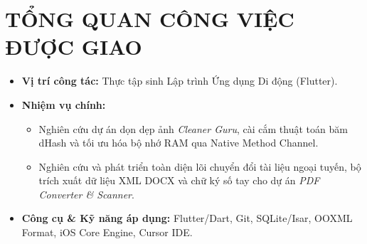 \documentclass[12pt, a4paper]{article}
\begin{document}
\section{TỔNG QUAN CÔNG VIỆC ĐƯỢC GIAO}
\begin{itemize}
    \item \textbf{Vị trí công tác:} Thực tập sinh Lập trình Ứng dụng Di động (Flutter).
    \item \textbf{Nhiệm vụ chính:} 
    \begin{itemize}
        \item Nghiên cứu dự án dọn dẹp ảnh \textit{Cleaner Guru}, cài cắm thuật toán băm dHash và tối ưu hóa bộ nhớ RAM qua Native Method Channel.
        \item Nghiên cứu và phát triển toàn diện lõi chuyển đổi tài liệu ngoại tuyến, bộ trích xuất dữ liệu XML DOCX và chữ ký số tay cho dự án \textit{PDF Converter \& Scanner}.
    \end{itemize}
    \item \textbf{Công cụ \& Kỹ năng áp dụng:} Flutter/Dart, Git, SQLite/Isar, OOXML Format, iOS Core Engine, Cursor IDE.
\end{itemize}

\newcommand{\cleanerUseCaseFigure}{%
\begin{figure}[H]
\centering
\begin{tikzpicture}[
    uc/.style={draw=blue!70!black, thick, fill=blue!6, ellipse, minimum width=4.6cm, minimum height=1.1cm, align=center, font=\small},
    actor_line/.style={ultra thick, draw=black!70},
    link_line/.style={thick, draw=black!70}
]
    \node (head) [circle, draw=black!80, ultra thick, minimum size=0.5cm] at (0, 0.3) {};
    \draw [actor_line] (head.south) -- ++(0, -0.6) coordinate (torso);
    \draw [actor_line] (head.south) ++(0, -0.15) -- ++(-0.35, -0.1);
    \draw [actor_line] (head.south) ++(0, -0.15) -- ++(0.35, -0.1);
    \draw [actor_line] (torso) -- ++(-0.25, -0.4);
    \draw [actor_line] (torso) -- ++(0.25, -0.4);
    \node (actor_label) [below=0.5cm of torso, font=\bfseries] {Người dùng};
    
    \coordinate (actor_link) at (0, 0.15);

    \draw[thick, draw=black!80] (1.8, 2.8) rectangle (10.2, -3.2);
    \node [fill=white, inner sep=4pt, font=\large\bfseries\color{blue!80!black}] at (6.0, 2.8) {Hệ thống Cleaner Guru};

    \node (uc1) [uc] at (6.0, 1.2) {Quét ảnh trùng lặp\\(dHash Algorithm)};
    \node (uc2) [uc] at (6.0, -0.4) {Dọn dẹp ảnh \& video\\(Giải phóng RAM/ROM)};
    \node (uc3) [uc] at (6.0, -2.0) {Hiển thị quảng cáo\\(Splash/Interstitial Ads)};
    
    \draw [link_line] (actor_link) -- (uc1.west);
    \draw [link_line] (actor_link) -- (uc2.west);
    \draw [link_line] (actor_link) -- (uc3.west);
\end{tikzpicture}
\caption{Sơ đồ UML Use Case hệ thống dọn dẹp ảnh thông minh Cleaner Guru}
\label{fig:cleaner_use_case}
\end{figure}
}
\end{document}
